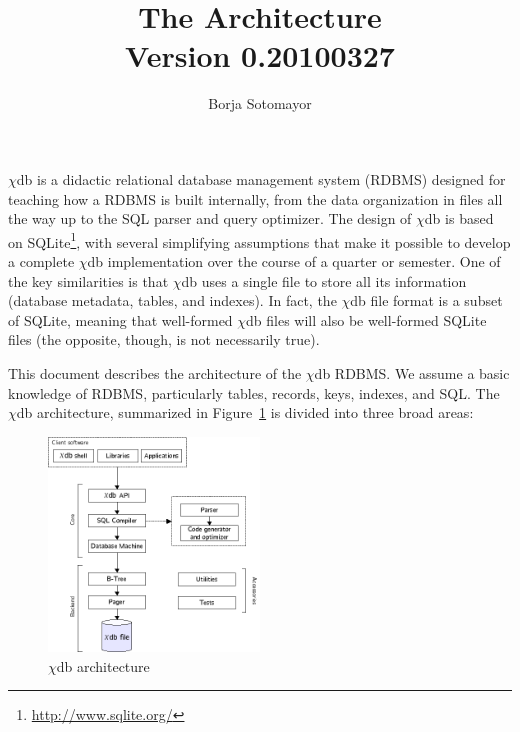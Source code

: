 \documentclass[10pt]{article}
\title{The \chidb{} Architecture\\{\large Version 0.20100327}}
\author{Borja Sotomayor}
\date{}
\newcommand{\chidb}{$\chi$\textsf{db}}
\begin{document}
\pagestyle{empty}
\maketitle

\chidb{} is a didactic relational database management system (RDBMS) designed for teaching how a RDBMS is built internally, from the data organization in files all the way up to the SQL parser and query optimizer. The design of \chidb{} is based on SQLite\footnote{\url{http://www.sqlite.org/}}, with several simplifying assumptions that make it possible to develop a complete \chidb{} implementation over the course of a quarter or semester. One of the key similarities is that \chidb{} uses a single file to store all its information (database metadata, tables, and indexes). In fact, the \chidb{} file format is a subset of SQLite, meaning that well-formed \chidb{} files will also be well-formed SQLite files (the opposite, though, is not necessarily true).

This document describes the architecture of the \chidb{} RDBMS. We assume a basic knowledge of RDBMS, particularly tables, records, keys, indexes, and SQL. The \chidb{} architecture, summarized in Figure~\ref{fig:arch} is divided into three broad areas:



\begin{figure}
\begin{center}
\includegraphics[width=0.5\textwidth]{images/arch_overview.png}
\caption{\chidb{} architecture}
\end{center}
\label{fig:arch}
\end{figure}
\end{document}
